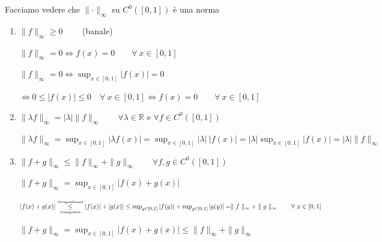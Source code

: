 \begin{exbar}
\begin{example}
	Facciamo vedere che $\parallel \cdot \parallel_\infty$ su $C^0 ([0,1])$ è una norma
	\begin{enumerate}
		\item $\parallel f \parallel_\infty \geq 0 \qquad$ (banale)
		
		$\parallel f \parallel_\infty =  0 \iff f(x) = 0 \qquad \forall \ x \in [0, 1]$
		
		$\parallel f \parallel_\infty =  0 \iff \sup_{x \in [0,1]} |f(x)| = 0$
		
		$\iff 0 \leq |f(x)| \leq 0 \quad \forall \ x \in [0,1] \iff f(x) = 0 \qquad \forall \ x \in [0,1]$
		
		\item $\parallel \lambda f \parallel_\infty = |\lambda| \parallel f \parallel_\infty \qquad \forall \lambda \in \mathbb{R}$ e $\forall f \in C^0 ([0,1])$
		
		$\parallel \lambda f \parallel_\infty = \sup_{x \in[0,1]} |\lambda f(x)| = \sup_{x\in[0,1]} |\lambda| \ |f(x)| = |\lambda| \sup_{x\in[0,1]} |f(x)| = |\lambda| \parallel f \parallel_\infty$
		
		\item $\parallel f+g \parallel_\infty \leq \parallel f \parallel_\infty + \parallel g \parallel_\infty \qquad \forall f,g \in C^0 ([0,1])$
		
		$\parallel f+g \parallel_\infty = \sup_{x\in[0,1]} |f(x) + g(x)|$
		
		$|f(x) + g(x)| \underset{\mbox{\tiny{triangolare}}}{\stackrel{\mbox{\tiny{disugualianza}}}{\leq}} |f(x)| + |g(x)| \leq \sup_{y\in[0,1]} |f(y)| + \sup_{y\in[0,1]} |g(y)| =  \parallel f \parallel_\infty + \parallel g \parallel_\infty \qquad \forall \ x \in [0,1]$
		
		$\parallel f+g \parallel_\infty = \sup_{x\in[0,1]} |f(x) + g(x)| \leq \parallel f \parallel_\infty + \parallel g \parallel_\infty$\\
	\end{enumerate}
\end{example}
\end{exbar}
	

